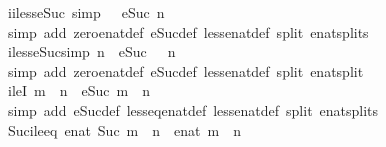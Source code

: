 \begin{isabellebody}
\endisatagproof
{\isafoldproof}%
%
\isadelimproof
\isanewline
%
\endisadelimproof
\isanewline
{}\isamarkupfalse%
\ i{}{\isacharunderscore}iless{\isacharunderscore}eSuc\ {\isacharbrackleft}simp{\isacharbrackright}{\isacharcolon}\ {\isachardoublequoteopen}{}\ {\isacharless}\ eSuc\ n{\isachardoublequoteclose}\isanewline
%
\isadelimproof
\ \ %
\endisadelimproof
%
\isatagproof
{}\isamarkupfalse%
\ {\isacharparenleft}simp\ add{\isacharcolon}\ zero{\isacharunderscore}enat{\isacharunderscore}def\ eSuc{\isacharunderscore}def\ less{\isacharunderscore}enat{\isacharunderscore}def\ split{\isacharcolon}\ enat{\isachardot}splits{\isacharparenright}%
\endisatagproof
{\isafoldproof}%
%
\isadelimproof
\isanewline
%
\endisadelimproof
\isanewline
{}\isamarkupfalse%
\ iless{\isacharunderscore}eSuc{}{\isacharbrackleft}simp{\isacharbrackright}{\isacharcolon}\ {\isachardoublequoteopen}{\isacharparenleft}n\ {\isacharless}\ eSuc\ {}{\isacharparenright}\ {\isacharequal}\ {\isacharparenleft}n\ {\isacharequal}\ {}{\isacharparenright}{\isachardoublequoteclose}\isanewline
%
\isadelimproof
\ \ %
\endisadelimproof
%
\isatagproof
{}\isamarkupfalse%
\ {\isacharparenleft}simp\ add{\isacharcolon}\ zero{\isacharunderscore}enat{\isacharunderscore}def\ eSuc{\isacharunderscore}def\ less{\isacharunderscore}enat{\isacharunderscore}def\ split{\isacharcolon}\ enat{\isachardot}split{\isacharparenright}%
\endisatagproof
{\isafoldproof}%
%
\isadelimproof
\isanewline
%
\endisadelimproof
\isanewline
{}\isamarkupfalse%
\ ileI{}{\isacharcolon}\ {\isachardoublequoteopen}m\ {\isacharless}\ n\ {\isasymLongrightarrow}\ eSuc\ m\ {\isasymle}\ n{\isachardoublequoteclose}\isanewline
%
\isadelimproof
\ \ %
\endisadelimproof
%
\isatagproof
{}\isamarkupfalse%
\ {\isacharparenleft}simp\ add{\isacharcolon}\ eSuc{\isacharunderscore}def\ less{\isacharunderscore}eq{\isacharunderscore}enat{\isacharunderscore}def\ less{\isacharunderscore}enat{\isacharunderscore}def\ split{\isacharcolon}\ enat{\isachardot}splits{\isacharparenright}%
\endisatagproof
{\isafoldproof}%
%
\isadelimproof
\isanewline
%
\endisadelimproof
\isanewline
{}\isamarkupfalse%
\ Suc{\isacharunderscore}ile{\isacharunderscore}eq{\isacharcolon}\ {\isachardoublequoteopen}enat\ {\isacharparenleft}Suc\ m{\isacharparenright}\ {\isasymle}\ n\ {\isasymlongleftrightarrow}\ enat\ m\ {\isacharless}\ n{\isachardoublequoteclose}\isanewline
%
\isadelimproof
\ \ %
\endisadelimproof
%
\isatagproof
{}\isamarkupfalse%

\end{isabellebody}
